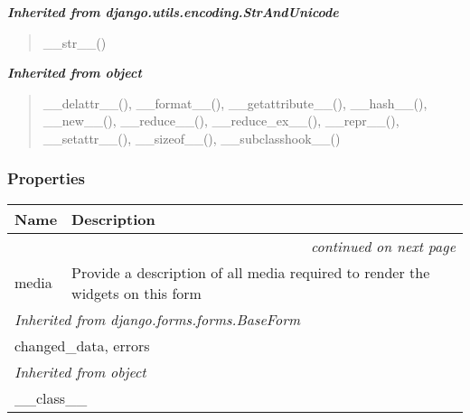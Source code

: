 \large{\textbf{\textit{Inherited from django.utils.encoding.StrAndUnicode}}}

\begin{quote}
\_\_str\_\_()
\end{quote}

\large{\textbf{\textit{Inherited from object}}}

\begin{quote}
\_\_delattr\_\_(), \_\_format\_\_(), \_\_getattribute\_\_(), \_\_hash\_\_(), \_\_new\_\_(), \_\_reduce\_\_(), \_\_reduce\_ex\_\_(), \_\_repr\_\_(), \_\_setattr\_\_(), \_\_sizeof\_\_(), \_\_subclasshook\_\_()
\end{quote}


  \subsubsection{Properties}

    \vspace{-1cm}
\hspace{\varindent}\begin{longtable}{|p{\varnamewidth}|p{\vardescrwidth}|l}
\cline{1-2}
\cline{1-2} \centering \textbf{Name} & \centering \textbf{Description}& \\
\cline{1-2}
\endhead\cline{1-2}\multicolumn{3}{r}{\small\textit{continued on next page}}\\\endfoot\cline{1-2}
\endlastfoot\raggedright m\-e\-d\-i\-a\- & \raggedright Provide a description of all media required to render the widgets
          on this form&\\
\cline{1-2}
\multicolumn{2}{|l|}{\textit{Inherited from django.forms.forms.BaseForm}}\\
\multicolumn{2}{|p{\varwidth}|}{\raggedright changed\_data, errors}\\
\cline{1-2}
\multicolumn{2}{|l|}{\textit{Inherited from object}}\\
\multicolumn{2}{|p{\varwidth}|}{\raggedright \_\_class\_\_}\\
\cline{1-2}
\end{longtable}



